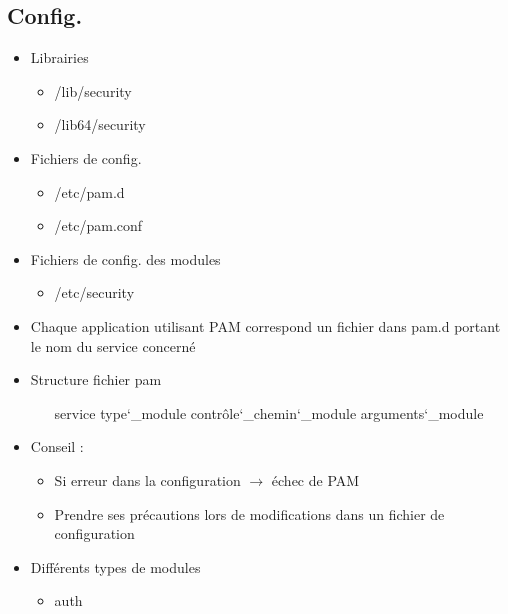 \documentclass[a4paper]{article}
\begin{document}
      \subsection{Config.}
      \begin{itemize}[label = \textbullet, font = \Large]
        \item Librairies
        \begin{itemize}[label=, font=\scriptsize] 
          \item /lib/security
          \item /lib64/security
        \end{itemize}
        \item Fichiers de config.
        \begin{itemize}[label=, font=\scriptsize] 
          \item /etc/pam.d
          \item /etc/pam.conf
        \end{itemize}
        \item Fichiers de config. des modules
        \begin{itemize}[label=, font=\scriptsize] 
          \item /etc/security
        \end{itemize}
        \item Chaque application utilisant PAM correspond un fichier dans pam.d portant le nom du service concerné
        \item Structure fichier pam
        \begin{itemize}[label=, font=\scriptsize] 
          \item [service] type\char`_module contrôle\char`_chemin\char`_module arguments\char`_module
        \end{itemize}
        \item Conseil :
        \begin{itemize}[label=, font=\scriptsize] 
          \item Si erreur dans la configuration $\rightarrow$ échec de PAM
          \item Prendre ses précautions lors de modifications dans un fichier de configuration
        \end{itemize}
        \item Différents types de modules
        \begin{itemize}[label=, font=\scriptsize] 
          \item auth

\end{itemize}
\end{itemize}
\end{document}
